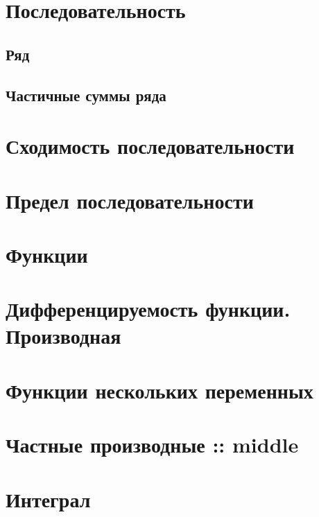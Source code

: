 \documentclass[
  letterpaper,
  DIV=11,
  numbers=noendperiod]{scrreprt}
\theoremstyle{definition}
\theoremstyle{remark}
\begin{document}
\section{Последовательность}\label{math-analysis-sequence}

\subsection{Ряд}\label{math-analysis-sequence-series}

\subsection{Частичные суммы
ряда}\label{math-analysis-sequence-partialsums}

\section{Сходимость последовательности}\label{math-analysis-convergence}

\section{Предел последовательности}\label{math-analysis-limit}

\section{Функции}\label{math-analysis-functions}

\section{Дифференцируемость функции.
Производная}\label{math-analysis-deriv}

\section{Функции нескольких
переменных}\label{math-analysis-multivariate}

\section{Частные производные ::
middle}\label{math-analysis-partialderiv}

\section{Интеграл}\label{math-analysis-integral}
\end{document}

